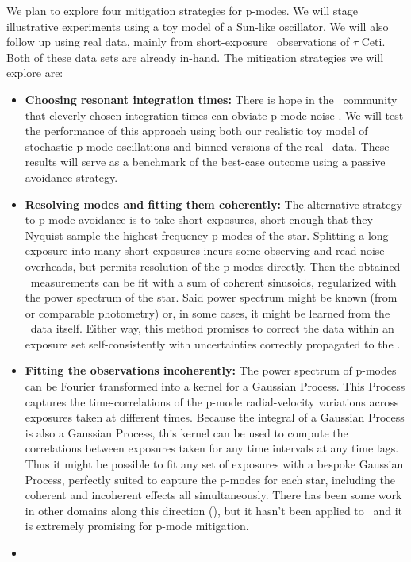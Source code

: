 \documentclass[12pt, letterpaper]{article}
\begin{document}
We plan to explore four mitigation strategies for p-modes. We will stage 
illustrative experiments using a toy model of a Sun-like oscillator. 
We will also follow up using real data, mainly from short-exposure 
\EXPRES\ observations of $\tau$ Ceti. Both of these data sets are already
in-hand. The mitigation strategies we will explore are:
\begin{itemize}
\item
\textbf{Choosing resonant integration times:}
There is hope in the \EPRV\ community that cleverly chosen integration
times can obviate p-mode noise \citep[see, \eg][]{Chaplin2019}.
We will test the performance of this approach using
both our realistic toy model of stochastic p-mode oscillations
and binned versions of the real \EXPRES\ data. 
These results will serve as a benchmark of the best-case outcome 
using a passive avoidance strategy.
\item
\textbf{Resolving modes and fitting them coherently:}
The alternative strategy to p-mode avoidance is to take short exposures,
short enough that they Nyquist-sample the highest-frequency p-modes of
the star.
Splitting a long exposure into many short exposures 
incurs some observing and read-noise overheads, but permits
resolution of the p-modes directly.
Then the obtained \RV\ measurements can be fit with a sum of coherent
sinusoids, regularized with the power spectrum of the
star. 
Said power spectrum might be known (from \TESS or comparable photometry) or,
in some cases, it might be learned from the \RV\ data itself. 
Either way, this method promises to correct the data within an exposure set 
self-consistently with uncertainties correctly propagated to the \RV.
\item
\textbf{Fitting the observations incoherently:}
The power spectrum of p-modes can be Fourier transformed into a kernel
for a Gaussian Process.
This Process captures the time-correlations of the p-mode
radial-velocity variations across exposures taken at different times.
Because the integral of a Gaussian Process is also a Gaussian Process,
this kernel can be used to compute the correlations between exposures
taken for any time intervals at any time lags.
Thus it might be possible to fit any set of exposures with a bespoke
Gaussian Process, perfectly suited to capture the p-modes for each
star, including the coherent and incoherent effects all simultaneously.
There has been some work in other domains along this direction (\citealt{DFMGP}),
but it hasn't been applied to \EPRV\ and it is extremely
promising for p-mode mitigation.
\item

\end{itemize}
\end{document}
